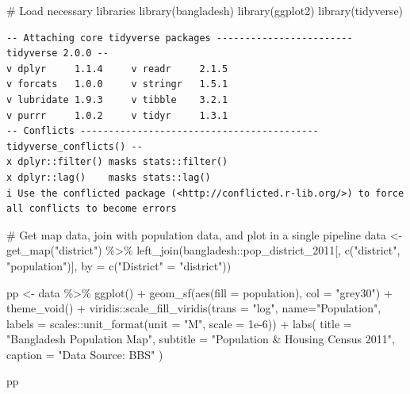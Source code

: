 \documentclass[
  letterpaper,
  DIV=11,
  numbers=noendperiod]{scrreprt}
\newenvironment{Shaded}{\begin{snugshade}}{\end{snugshade}}
\newcommand{\AttributeTok}[1]{\textcolor[rgb]{0.40,0.45,0.13}{#1}}
\newcommand{\CommentTok}[1]{\textcolor[rgb]{0.37,0.37,0.37}{#1}}
\newcommand{\FloatTok}[1]{\textcolor[rgb]{0.68,0.00,0.00}{#1}}
\newcommand{\FunctionTok}[1]{\textcolor[rgb]{0.28,0.35,0.67}{#1}}
\newcommand{\NormalTok}[1]{\textcolor[rgb]{0.00,0.23,0.31}{#1}}
\newcommand{\OtherTok}[1]{\textcolor[rgb]{0.00,0.23,0.31}{#1}}
\newcommand{\SpecialCharTok}[1]{\textcolor[rgb]{0.37,0.37,0.37}{#1}}
\newcommand{\StringTok}[1]{\textcolor[rgb]{0.13,0.47,0.30}{#1}}
\begin{document}
\begin{Shaded}
\begin{Highlighting}[]
\CommentTok{\# Load necessary libraries}
\FunctionTok{library}\NormalTok{(bangladesh)}
\FunctionTok{library}\NormalTok{(ggplot2)}
\FunctionTok{library}\NormalTok{(tidyverse)}
\end{Highlighting}
\end{Shaded}

\begin{verbatim}
-- Attaching core tidyverse packages ------------------------ tidyverse 2.0.0 --
v dplyr     1.1.4     v readr     2.1.5
v forcats   1.0.0     v stringr   1.5.1
v lubridate 1.9.3     v tibble    3.2.1
v purrr     1.0.2     v tidyr     1.3.1
-- Conflicts ------------------------------------------ tidyverse_conflicts() --
x dplyr::filter() masks stats::filter()
x dplyr::lag()    masks stats::lag()
i Use the conflicted package (<http://conflicted.r-lib.org/>) to force all conflicts to become errors
\end{verbatim}

\begin{Shaded}
\begin{Highlighting}[]
\CommentTok{\# Get map data, join with population data, and plot in a single pipeline}
\NormalTok{data }\OtherTok{\textless{}{-}} \FunctionTok{get\_map}\NormalTok{(}\StringTok{"district"}\NormalTok{) }\SpecialCharTok{\%\textgreater{}\%}
  \FunctionTok{left\_join}\NormalTok{(bangladesh}\SpecialCharTok{::}\NormalTok{pop\_district\_2011[, }\FunctionTok{c}\NormalTok{(}\StringTok{"district"}\NormalTok{, }\StringTok{"population"}\NormalTok{)], }\AttributeTok{by =} \FunctionTok{c}\NormalTok{(}\StringTok{"District"} \OtherTok{=} \StringTok{"district"}\NormalTok{))}

\NormalTok{pp }\OtherTok{\textless{}{-}}\NormalTok{ data }\SpecialCharTok{\%\textgreater{}\%} 
  \FunctionTok{ggplot}\NormalTok{() }\SpecialCharTok{+}
  \FunctionTok{geom\_sf}\NormalTok{(}\FunctionTok{aes}\NormalTok{(}\AttributeTok{fill =}\NormalTok{ population), }\AttributeTok{col =} \StringTok{"grey30"}\NormalTok{) }\SpecialCharTok{+}
  \FunctionTok{theme\_void}\NormalTok{() }\SpecialCharTok{+}
\NormalTok{  viridis}\SpecialCharTok{::}\FunctionTok{scale\_fill\_viridis}\NormalTok{(}\AttributeTok{trans =} \StringTok{"log"}\NormalTok{, }\AttributeTok{name=}\StringTok{"Population"}\NormalTok{, }\AttributeTok{labels =}\NormalTok{ scales}\SpecialCharTok{::}\FunctionTok{unit\_format}\NormalTok{(}\AttributeTok{unit =} \StringTok{"M"}\NormalTok{, }\AttributeTok{scale =} \FloatTok{1e{-}6}\NormalTok{)) }\SpecialCharTok{+}
  \FunctionTok{labs}\NormalTok{(}
    \AttributeTok{title =} \StringTok{"Bangladesh Population Map"}\NormalTok{,}
    \AttributeTok{subtitle =} \StringTok{"Population \& Housing Census 2011"}\NormalTok{,}
    \AttributeTok{caption =} \StringTok{"Data Source: BBS"}
\NormalTok{  )}

\NormalTok{pp}
\end{Highlighting}
\end{Shaded}
\end{document}
